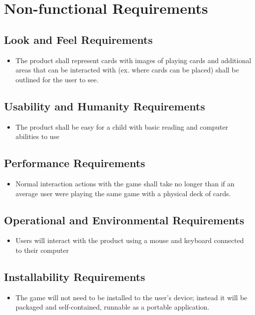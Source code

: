 \documentclass[12pt, titlepage]{article}
\begin{document}
	\section{Non-functional Requirements}
		\subsection{Look and Feel Requirements}
		\begin{itemize}
			\itemsep0em
			\item The product shall represent cards with images of playing 
			cards and additional areas that can be interacted with (ex. where 
			cards can be placed) shall be outlined for the user to see.
		\end{itemize}
		\subsection{Usability and Humanity Requirements}
		\begin{itemize}
			\itemsep0em
			\item The product shall be easy for a child with basic reading and 
			computer abilities to use
		\end{itemize}
		\subsection{Performance Requirements}
		\begin{itemize}
			\itemsep0em
			\item Normal interaction actions with the game shall take no longer 
			than if an average user were playing the same game with a physical 
			deck of cards.
		\end{itemize}
		\subsection{Operational and Environmental Requirements}
		\begin{itemize}
			\itemsep0em
			\item Users will interact with the product using a mouse and 
			keyboard connected to their computer
		\end{itemize}
		\subsection{Installability Requirements}
		\begin{itemize}
			\itemsep0em
			\item The game will not need to be installed to the user's device; instead
			it will be packaged and self-contained, runnable as a portable application.
		\end{itemize}
\end{document}
